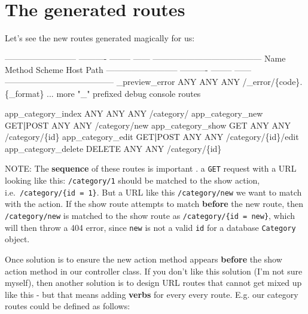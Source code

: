 \documentclass[a4paperpaper,openright]{book}
\newenvironment{Shaded}{}{}
\newcommand{\DataTypeTok}[1]{\textcolor[rgb]{0.56,0.13,0.00}{#1}}
\newcommand{\ExtensionTok}[1]{#1}
\newcommand{\KeywordTok}[1]{\textcolor[rgb]{0.00,0.44,0.13}{\textbf{#1}}}
\newcommand{\NormalTok}[1]{#1}
\newcommand{\StringTok}[1]{\textcolor[rgb]{0.25,0.44,0.63}{#1}}
\begin{document}
\hypertarget{the-generated-routes}{%
\section{The generated routes}\label{the-generated-routes}}

Let's see the new routes generated magically for us:

\begin{Shaded}
\begin{Highlighting}[]
     \ExtensionTok{--------------------------}\NormalTok{ ---------- -------- ------ ---------------------------------------}
      \ExtensionTok{Name}\NormalTok{                       Method     Scheme   Host   Path}
     \ExtensionTok{--------------------------}\NormalTok{ ---------- -------- ------ ---------------------------------------}
      \ExtensionTok{_preview_error}\NormalTok{             ANY        ANY      ANY    /_error/}\DataTypeTok{\{code\}}\NormalTok{.}\DataTypeTok{\{_format\}}
      \ExtensionTok{...}\NormalTok{ more }\StringTok{"_"}\NormalTok{ prefixed debug console routes}

      \ExtensionTok{app_category_index}\NormalTok{             ANY        ANY      ANY    /category/}
      \ExtensionTok{app_category_new}\NormalTok{               GET}\KeywordTok{|}\ExtensionTok{POST}\NormalTok{   ANY      ANY    /category/new}
      \ExtensionTok{app_category_show}\NormalTok{              GET        ANY      ANY    /category/}\DataTypeTok{\{id\}}
      \ExtensionTok{app_category_edit}\NormalTok{              GET}\KeywordTok{|}\ExtensionTok{POST}\NormalTok{   ANY      ANY    /category/}\DataTypeTok{\{id\}}\NormalTok{/edit}
      \ExtensionTok{app_category_delete}\NormalTok{            DELETE     ANY      ANY    /category/}\DataTypeTok{\{id\}}
\end{Highlighting}
\end{Shaded}

NOTE: The \textbf{sequence} of these routes is important . a
\texttt{GET} request with a URL looking like this: \texttt{/category/1}
should be matched to the show action,
i.e.~\texttt{/category/\{id\ =\ 1\}}. But a URL like this
\texttt{/category/new} we want to match with the action. If the show
route attempts to match \textbf{before} the new route, then
\texttt{/category/new} is matched to the show route as
\texttt{/category/\{id\ =\ new\}}, which will then throw a 404 error,
since \texttt{new} is not a valid \texttt{id} for a database
\texttt{Category} object.

Once solution is to ensure the new action method appears \textbf{before}
the show action method in our controller class. If you don't like this
solution (I'm not sure myself), then another solution is to design URL
routes that cannot get mixed up like this - but that means adding
\textbf{verbs} for every every route. E.g. our category routes could be
defined as follows:
\end{document}
